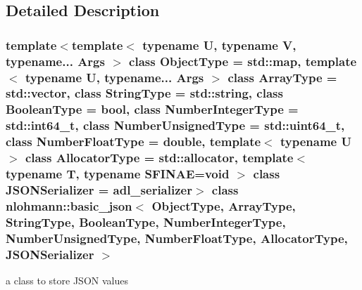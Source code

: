 \subsection{Detailed Description}
\subsubsection*{template$<$template$<$ typename U, typename V, typename... Args $>$ class Object\+Type = std\+::map, template$<$ typename U, typename... Args $>$ class Array\+Type = std\+::vector, class String\+Type = std\+::string, class Boolean\+Type = bool, class Number\+Integer\+Type = std\+::int64\+\_\+t, class Number\+Unsigned\+Type = std\+::uint64\+\_\+t, class Number\+Float\+Type = double, template$<$ typename U $>$ class Allocator\+Type = std\+::allocator, template$<$ typename T, typename S\+F\+I\+N\+A\+E=void $>$ class J\+S\+O\+N\+Serializer = adl\+\_\+serializer$>$\newline
class nlohmann\+::basic\+\_\+json$<$ Object\+Type, Array\+Type, String\+Type, Boolean\+Type, Number\+Integer\+Type, Number\+Unsigned\+Type, Number\+Float\+Type, Allocator\+Type, J\+S\+O\+N\+Serializer $>$}

a class to store J\+S\+ON values 


